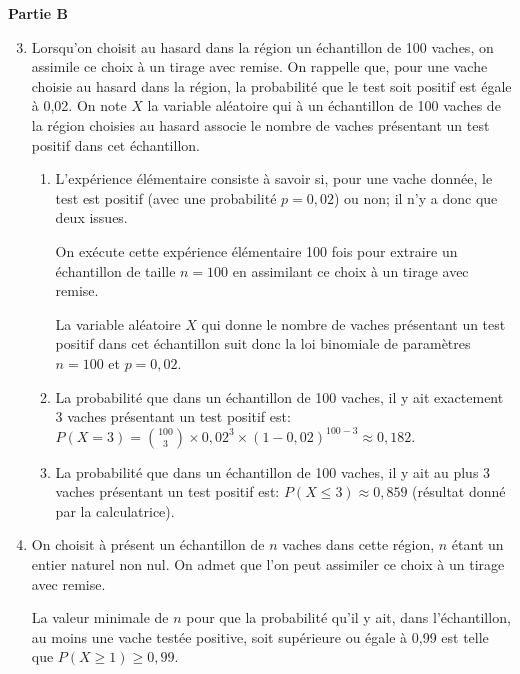 \documentclass[10pt]{article}
\providecommand{\ds}{\displaystyle}
\begin{document}
\medskip

\textbf{Partie B}



\begin{enumerate}
\setcounter{enumi}{2}
	\item Lorsqu'on choisit au hasard dans la région un échantillon de 100 vaches, on assimile ce choix à un tirage avec remise.	
On rappelle que, pour une vache choisie au hasard dans la région, la probabilité que le test soit positif est égale à 0,02.
On note $X$ la variable aléatoire qui à un échantillon de 100 vaches de la région choisies au hasard associe le nombre de vaches présentant un test positif dans cet échantillon.

	\begin{enumerate}
		\item 
L'expérience élémentaire consiste à savoir si, pour une vache donnée, le test est positif (avec une probabilité $p=0,02$) ou non; il n'y a donc que deux issues.

On exécute cette expérience élémentaire 100 fois pour extraire un échantillon de taille $n=100$ en assimilant ce choix à un tirage avec remise.

La variable aléatoire $X$ qui donne  le nombre de vaches présentant un test positif dans cet échantillon suit donc la loi binomiale de paramètres $n=100$ et $p=0,02$.

		\item La probabilité que dans un échantillon de 100 vaches, il y ait exactement 3 vaches présentant un test positif est:	
$P(X=3) = \ds\binom{100}{3}\times 0,02^{3}\times (1-0,02)^{100-3}
\approx 0,182$.
				


		\item La probabilité que dans un échantillon de 100 vaches, il y ait au plus 3 vaches présentant un test positif est:		
$P(X\leqslant 3)\approx 0,859$ (résultat donné par la calculatrice).		
		



	\end{enumerate}

	\item On choisit à présent un échantillon de $n$ vaches dans cette région, $n$ étant un entier naturel non nul. On admet que l'on peut assimiler ce choix à un tirage avec remise.

La valeur minimale de $n$ pour que la probabilité qu'il y ait, dans l'échantillon, au moins une vache testée positive, soit supérieure ou égale à 0,99 est telle que
$P(X\geqslant 1) \geqslant 0,99$.


\end{enumerate}
\end{document}

